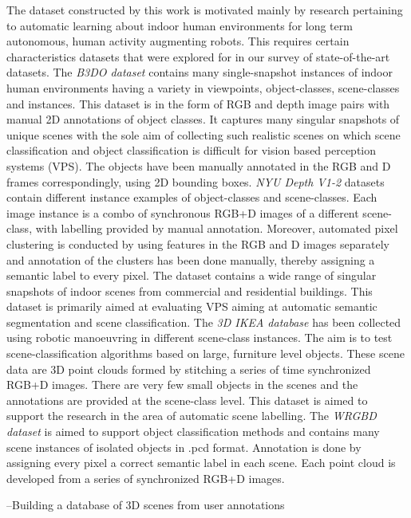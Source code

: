 \documentclass[letterpaper, 10 pt, conference]{ieeeconf}  %
\begin{document}
The dataset constructed by this work is motivated mainly by research pertaining to automatic learning about indoor human environments for long term autonomous, human activity augmenting robots. This requires certain characteristics datasets that were explored for in our survey of state-of-the-art datasets. The \textit{B3DO dataset} \cite{Janoch:ICCV2011} contains many single-snapshot instances of indoor human environments having a variety in viewpoints, object-classes, scene-classes and instances. This dataset is in the form of RGB and depth image pairs with manual 2D annotations of object classes. It captures many singular snapshots of unique scenes with the sole aim of collecting such realistic scenes on which scene classification and object classification is difficult for vision based perception systems (VPS). The objects have been manually annotated in the RGB and D frames correspondingly, using 2D bounding boxes.
\textit{NYU Depth V1-2} \cite{Silberman:ECCV2012} datasets contain different instance examples of object-classes and scene-classes. Each image instance is a combo of synchronous RGB+D images of a different scene-class, with labelling provided by manual annotation. Moreover, automated pixel clustering is conducted by using features in the RGB and D images separately and annotation of the clusters has been done manually, thereby assigning a semantic label to every pixel. The dataset contains a wide range of singular snapshots of indoor scenes from commercial and residential buildings. This dataset is primarily aimed at evaluating VPS aiming at automatic semantic segmentation and scene classification.
The \textit{3D IKEA database} \cite{Swadzba:RAS2012} has been collected using robotic manoeuvring in different scene-class instances. The aim is to test scene-classification algorithms based on large, furniture level objects. These scene data are 3D point clouds formed by stitching a series of time synchronized RGB+D images. There are very few small objects in the scenes and the annotations are provided at the scene-class level. This dataset is aimed to support the research in the area of automatic scene labelling.
The \textit{WRGBD dataset} \cite{Lai:ICRA2011} is aimed to support object classification methods and contains many scene instances of isolated objects in .pcd format. Annotation is done by assigning every pixel a correct semantic label in each scene. Each point cloud is developed from a series of synchronized RGB+D images.

--Building a database of 3D scenes from user annotations 
\end{document}

